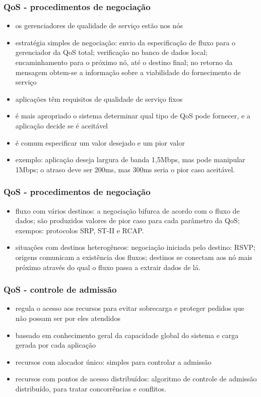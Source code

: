\documentclass[]{beamer}
\begin{document}
\begin{frame}
  \frametitle{QoS - procedimentos de negociação}
\begin{itemize}
  \item os gerenciadores de qualidade de serviço estão nos nós
  \item estratégia simples de negociação: envio da especificação de fluxo para o gerenciador
da QoS total; verificação no banco de dados local; encaminhamento para o próximo nó, até
 o destino final; no retorno da mensagem obtem-se a informação sobre a 
viabilidade do fornecimento de serviço
  \item aplicações têm requisitos de qualidade de serviço fixos
  \item é mais apropriado o sistema determinar qual tipo de QoS pode fornecer, e a aplicação
decide se é aceitável
  \item é comum especificar um valor desejado e um pior valor
  \item exemplo: aplicação deseja largura de banda 1,5Mbps, mas pode manipular 1Mbps; o atraso
deve ser 200ms, mas 300ms seria o pior caso aceitável.
\end{itemize}
\end{frame}

\begin{frame}
  \frametitle{QoS - procedimentos de negociação}
\begin{itemize}
  \item fluxo com vários destinos: a negociação bifurca de acordo
com o fluxo de dados; são produzidos valores de pior caso para cada parâmetro da QoS;
exempos: protocolos SRP, ST-II e RCAP.
  \item situações com destinos heterogêneos: negociação iniciada pelo destino: 
RSVP; origens comunicam a existência
dos fluxos; destinos se conectam aos nó mais próximo através do qual o fluxo passa a extrair
dados de lá.
\end{itemize}
\end{frame}

\begin{frame}
  \frametitle{QoS - controle de admissão}
\begin{itemize}
  \item regula o acesso aos recursos para evitar sobrecarga e proteger pedidos que não possam
ser por eles atendidos
  \item baseado em conhecimento geral da capacidade global do sistema e carga gerada
por cada aplicação
  \item recursos com alocador único: simples para controlar a admissão
  \item recursos com pontos de acesso distribuídos: algoritmo 
de controle de admissão distribuído, para tratar concorrências e conflitos.
\end{itemize}
\end{frame}
\end{document}
